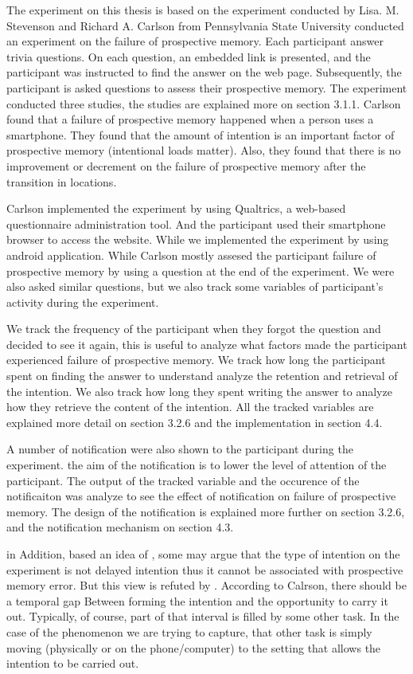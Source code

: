The experiment on this thesis is based on the experiment conducted by Lisa. M. Stevenson and Richard A. Carlson from Pennsylvania State University conducted an
experiment on the failure of prospective memory.
Each participant answer trivia questions.
 On each question, an embedded link is presented, and the participant was instructed to find the answer on the web page.
 Subsequently, the participant is asked questions to assess their prospective memory.
The experiment conducted three studies, the studies are explained more on section 3.1.1.
Carlson found that a failure of prospective memory happened when a person uses a smartphone.
They found that the amount of intention is an important factor of prospective memory (intentional loads matter).
Also, they found that there is no improvement or decrement on the failure of prospective memory after the transition in locations.

Carlson implemented the experiment by using Qualtrics, a web-based questionnaire administration tool. And the participant
used their smartphone browser to access the website. While we implemented the experiment by using android application.
While Carlson mostly assesed the participant failure of prospective memory by using a question at the end of the experiment. We were also
asked similar questions, but we also track some variables of participant's activity during the experiment.

We track the frequency of the participant when they forgot the question and decided to see it again, this is useful to analyze what factors made the participant experienced
failure of prospective memory. We track how long the participant spent on finding the answer to understand analyze the retention and retrieval of the intention.
We also track how long they spent writing the answer to analyze how they retrieve the content of the intention. All the tracked variables are explained
more detail on section 3.2.6 and the implementation in section 4.4.

A number of notification were also shown to the participant during the experiment. the aim of the notification
is to lower the level of attention of the participant. The output of the tracked variable and the occurence of the notificaiton
was analyze to see the effect of notification on failure of prospective memory. The design of the notification is explained more further on section 3.2.6, and
the notification mechanism on section 4.3.

in Addition, based an idea of \cite{inside1996prospective}, some may argue that the type of intention on the experiment is not delayed intention
thus it cannot be associated with prospective memory error. But this view is
refuted by \cite{10.1371/journal.pone.0074447}. According to Calrson, there should be a temporal gap
Between forming the intention and the opportunity to carry it out. Typically, of course, part of that interval is filled by some other task.
In the case of the phenomenon we are trying to capture, that other task is simply moving (physically or on the phone/computer) to the setting that allows the intention to be carried out.
